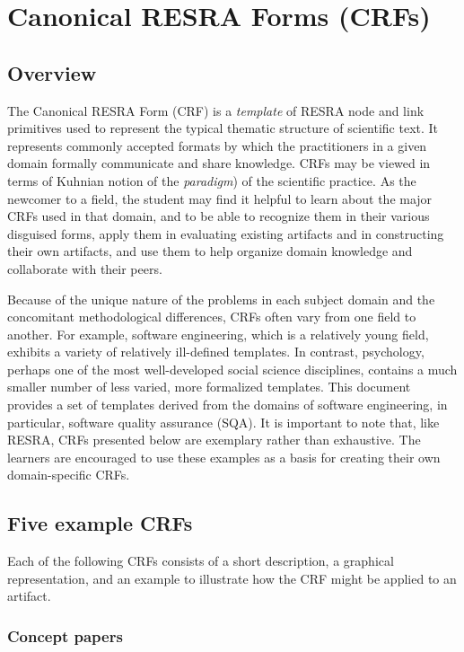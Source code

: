 \section{Canonical RESRA Forms (CRFs)}
\label{sec:crf}

\subsection{Overview}

The Canonical RESRA Form (CRF) is a {\it template\/} of RESRA node and link
primitives used to represent the typical thematic structure of scientific
text.  It represents commonly accepted formats by which the practitioners
in a given domain formally communicate and share knowledge. CRFs may be
viewed in terms of Kuhnian notion of the {\it paradigm\/}) of the
scientific practice. As the newcomer to a field, the student may find it
helpful to learn about the major CRFs used in that domain, and to be able
to recognize them in their various disguised forms, apply them in
evaluating existing artifacts and in constructing their own artifacts, and
use them to help organize domain knowledge and collaborate with their
peers.

Because of the unique nature of the problems in each subject domain and the
concomitant methodological differences, CRFs often vary from one field to
another.  For example, software engineering, which is a relatively young
field, exhibits a variety of relatively ill-defined templates.  In
contrast, psychology, perhaps one of the most well-developed social science
disciplines, contains a much smaller number of less varied, more formalized
templates. This document provides a set of templates derived from the
domains of software engineering, in particular, software quality
assurance (SQA). It is important to note that, like RESRA, CRFs presented
below are exemplary rather than exhaustive. The learners are encouraged to
use these examples as a basis for creating their own domain-specific CRFs.


\subsection{Five example CRFs}

Each of the following CRFs consists of a short description, a graphical
representation, and an example to illustrate how the CRF might be applied
to an artifact.


\subsubsection{Concept papers}

